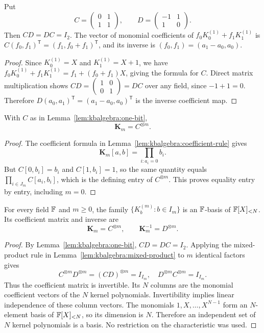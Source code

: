 \begin{lemma}\label{lem:kbalgebra:one-bit}
Put
\[
 C=\begin{pmatrix}0&1\\1&1\end{pmatrix},\qquad
 D=\begin{pmatrix}-1&1\\1&0\end{pmatrix}.
\]
Then $CD=DC=I_2$. The vector of monomial coefficients of $f_0K_0^{(1)}+f_1K_1^{(1)}$ is $C(f_0,f_1)^{\mathsf T}=(f_1,f_0+f_1)^{\mathsf T}$, and its inverse is $(f_0,f_1)=(a_1-a_0,a_0)$.
\end{lemma}
\begin{proof}
Since $K_0^{(1)}=X$ and $K_1^{(1)}=X+1$, we have $f_0K_0^{(1)}+f_1K_1^{(1)}=f_1+(f_0+f_1)X$, giving the formula for $C$. Direct matrix multiplication shows
$CD=\left(\begin{smallmatrix}1&0\\0&1\end{smallmatrix}\right)=DC$ over any field, since $-1+1=0$. Therefore $D(a_0,a_1)^{\mathsf T}=(a_1-a_0,a_0)^{\mathsf T}$ is the inverse coefficient map.
\end{proof}

\begin{proposition}\label{prop:kbalgebra:kronecker}
With $C$ as in Lemma~\ref{lem:kbalgebra:one-bit},
\[
 \boxed{\mathbf K_m=C^{\otimes m}.}
\]
\end{proposition}
\begin{proof}
The coefficient formula in Lemma~\ref{lem:kbalgebra:coefficient-rule} gives
\[
 \mathbf K_m[a,b]=\prod_{i:a_i=0}b_i.
\]
But $C[0,b_i]=b_i$ and $C[1,b_i]=1$, so the same quantity equals $\prod_{i\in J_m}C[a_i,b_i]$, which is the defining entry of $C^{\otimes m}$. This proves equality entry by entry, including $m=0$.
\end{proof}

\begin{theorem}\label{thm:kbalgebra:basis}
For every field $\mathbb{F}$ and $m\geq0$, the family $\{K_b^{(m)}:b\in I_m\}$ is an $\mathbb{F}$-basis of $\mathbb{F}[X]_{<N}$. Its coefficient matrix and inverse are
\[
 \mathbf K_m=C^{\otimes m},\qquad
 \mathbf K_m^{-1}=D^{\otimes m}.
\]
\end{theorem}
\begin{proof}
By Lemma~\ref{lem:kbalgebra:one-bit}, $CD=DC=I_2$. Applying the mixed-product rule in Lemma~\ref{lem:kbalgebra:mixed-product} to $m$ identical factors gives
\[
 C^{\otimes m}D^{\otimes m}=(CD)^{\otimes m}=I_{I_m},
 \quad D^{\otimes m}C^{\otimes m}=I_{I_m}.
\]
Thus the coefficient matrix is invertible. Its $N$ columns are the monomial coefficient vectors of the $N$ kernel polynomials. Invertibility implies linear independence of these column vectors. The monomials $1,X,\ldots,X^{N-1}$ form an $N$-element basis of $\mathbb{F}[X]_{<N}$, so its dimension is $N$. Therefore an independent set of $N$ kernel polynomials is a basis. No restriction on the characteristic was used.
\end{proof}

